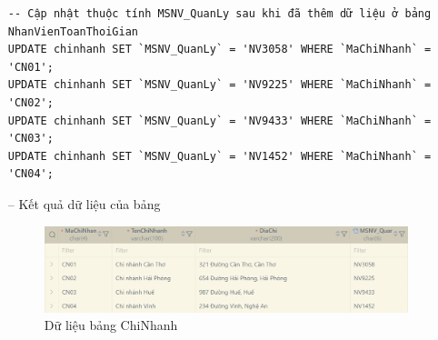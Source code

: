 \begin{itemize}
\begin{verbatim}
-- Cập nhật thuộc tính MSNV_QuanLy sau khi đã thêm dữ liệu ở bảng NhanVienToanThoiGian
UPDATE chinhanh SET `MSNV_QuanLy` = 'NV3058' WHERE `MaChiNhanh` = 'CN01';
UPDATE chinhanh SET `MSNV_QuanLy` = 'NV9225' WHERE `MaChiNhanh` = 'CN02';
UPDATE chinhanh SET `MSNV_QuanLy` = 'NV9433' WHERE `MaChiNhanh` = 'CN03';
UPDATE chinhanh SET `MSNV_QuanLy` = 'NV1452' WHERE `MaChiNhanh` = 'CN04';
    \end{verbatim}
    \item [--] Kết quả dữ liệu của bảng
    \begin{figure}[H]
        \centering
        \includegraphics[width=1\linewidth]{content/images/data_chinhanh.png}
        \caption{Dữ liệu bảng ChiNhanh}
        \label{fig:data_chinhanh}
    \end{figure}
\end{itemize}
\newpage
